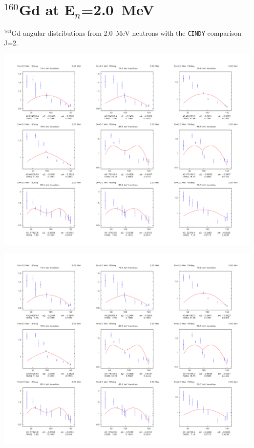 \section{$^{160}$Gd at E$_n$=2.0~MeV}\label{app:AD_Gd_20}%
$^{160}$Gd angular distributions from 2.0~MeV neutrons with the {\tt CINDY} comparison J=2.
\begin{center}
\includegraphics[page=1,angle=90,height=0.95\textheight]{160Gd_20_AD_2.pdf}
\end{center}
\begin{center}
\includegraphics[page=2,angle=90,height=0.95\textheight]{160Gd_20_AD_2.pdf}
\end{center}
